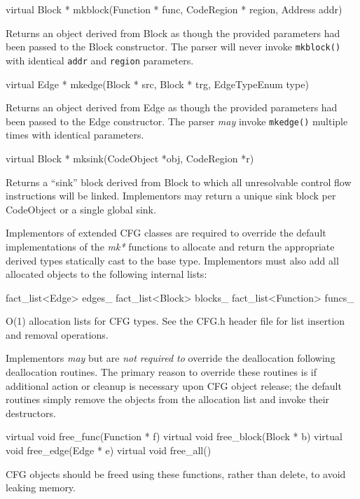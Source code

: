\documentclass{article}
\newenvironment{apient}{\small\verbatim}{\endverbatim}
\newcommand{\apidesc}[1]{%
{\addtolength{\leftskip}{4em}%
#1\par\medskip}
}
\begin{document}
\begin{apient}
virtual Block * mkblock(Function * func, CodeRegion * region, Address addr)
\end{apient}
\apidesc{Returns an object derived from Block as though the provided parameters had been passed to the Block constructor. The parser will never invoke \texttt{mkblock()} with identical \texttt{addr} and \texttt{region} parameters.}

\begin{apient}
virtual Edge * mkedge(Block * src, Block * trg, EdgeTypeEnum type)
\end{apient}
\apidesc{Returns an object derived from Edge as though the provided parameters had been passed to the Edge constructor. The parser \emph{may} invoke \texttt{mkedge()} multiple times with identical parameters.}

\begin{apient}
virtual Block * mksink(CodeObject *obj, CodeRegion *r)
\end{apient}
\apidesc{Returns a ``sink'' block derived from Block to which all unresolvable control flow instructions will be linked. Implementors may return a unique sink block per CodeObject or a single global sink.}

Implementors of extended CFG classes are required to override the default implementations of the \emph{mk*} functions to allocate and return the appropriate derived types statically cast to the base type. Implementors must also add all allocated objects to the following internal lists:

\begin{apient}
fact_list<Edge> edges_
fact_list<Block> blocks_
fact_list<Function> funcs_
\end{apient}
\apidesc{O(1) allocation lists for CFG types. See the CFG.h header file for list insertion and removal operations.}

Implementors \emph{may} but are \emph{not required to} override the
deallocation following deallocation routines. The primary reason to override
these routines is if additional action or cleanup is necessary upon CFG object
release; the default routines simply remove the objects from the allocation
list and invoke their destructors.

\begin{apient}
virtual void free_func(Function * f)
virtual void free_block(Block * b)
virtual void free_edge(Edge * e)
virtual void free_all()
\end{apient}
\apidesc{CFG objects should be freed using these functions, rather than delete, to avoid leaking memory.}
\end{document}
